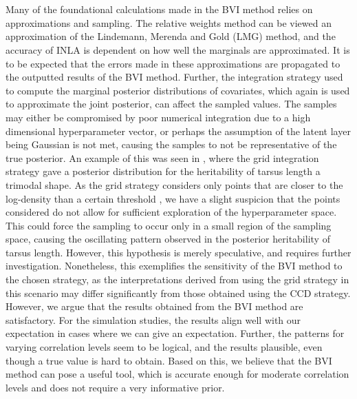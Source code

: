 \\
\\
Many of the foundational calculations made in the BVI method relies on approximations and sampling. The relative weights method can be viewed an approximation of the Lindemann, Merenda and Gold (LMG) method, and the accuracy of INLA is dependent on how well the marginals are approximated. It is to be expected that the errors made in these approximations are propagated to the outputted results of the BVI method. Further, the integration strategy used to compute the marginal posterior distributions of covariates, which again is used to approximate the joint posterior, can affect the sampled values. The samples may either be compromised by poor numerical integration due to a high dimensional hyperparameter vector, or perhaps the assumption of the latent layer being Gaussian is not met, causing the samples to not be representative of the true posterior. An example of this was seen in , where the grid integration strategy gave a posterior distribution for the heritability of tarsus length a trimodal shape. As the grid strategy considers only points that are closer to the log-density than a certain threshold \citep[See Figure 2.1 for Illustration]{gomezrubio2020inla}, we have a slight suspicion that the points considered do not allow for sufficient exploration of the hyperparameter space. This could force the sampling to occur only in a small region of the sampling space, causing the oscillating pattern observed in the posterior heritability of tarsus length. However, this hypothesis is merely speculative, and requires further investigation. Nonetheless, this exemplifies the sensitivity of the BVI method to the chosen strategy, as the interpretations derived from using the grid strategy in this scenario may differ significantly from those obtained using the CCD strategy. However, we argue that the results obtained from the BVI method are satisfactory. For the simulation studies, the results align well with our expectation in cases where we can give an expectation. Further, the patterns for varying correlation levels seem to be logical, and the results plausible, even though a true value is hard to obtain. Based on this, we believe that the BVI method can pose a useful tool, which is accurate enough for moderate correlation levels and does not require a very informative prior.
